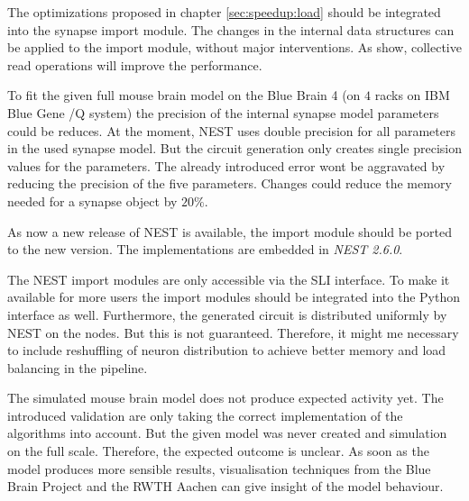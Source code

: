 The optimizations proposed in chapter \ref{sec:speedup:load} should be integrated into the synapse import module.
The changes in the internal data structures can be applied to the import module, without major interventions.
As show, collective read operations will improve the performance.

To fit the given full mouse brain model on the Blue Brain 4 (on $4$ racks on IBM Blue Gene /Q system) the precision of the internal synapse model parameters could be reduces.
At the moment, NEST uses double precision
for all parameters in the used synapse model.
But the circuit generation only creates single precision values for the parameters.
The already introduced error wont be aggravated
by reducing the precision of the five parameters.
Changes could reduce the memory needed for a synapse object by $20\%$.

As now a new release of NEST is available, the import module should
be ported to the new version. The implementations are embedded in \emph{NEST 2.6.0}.

The NEST import modules are only accessible via the SLI interface\cite{SLI}.
To make it available for more users the import modules should be integrated into the Python
interface as well. Furthermore, the generated circuit is distributed uniformly by NEST on the nodes. But this is not guaranteed. Therefore, it might me necessary to include reshuffling of neuron distribution to achieve better memory and load balancing in the pipeline.

The simulated mouse brain model does not produce expected activity yet.
The introduced validation are only taking the correct implementation of the algorithms into account.
But the given model was never created and simulation on the full scale. Therefore, the expected outcome is unclear. As soon as the model produces more sensible results, visualisation techniques from the
Blue Brain Project and the RWTH Aachen can give insight of the model behaviour.
